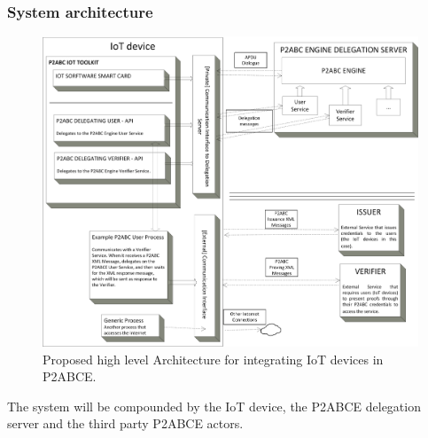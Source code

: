 \documentclass[journal]{IEEEtran}
\begin{document}
\subsubsection{System architecture}



\begin{figure}[bth]
	\begin{center}
		\includegraphics[width=\linewidth]{gfx/P2ABCE-IoT-bw}
	\end{center}
	\caption{Proposed high level Architecture for integrating IoT devices in P2ABCE.}
	\label{fig:P2ABCE-IoT}
\end{figure}


\hfil


The system will be compounded by the IoT device, the P2ABCE delegation server and the third party P2ABCE actors.
\end{document}
